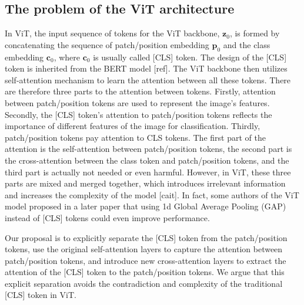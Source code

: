 \documentclass[anon,12pt]{colt2024} %
\begin{document}
\subsection{The problem of the ViT architecture}

In ViT, the input sequence of tokens for the ViT backbone, $\mathbf{z}_0$, is formed by concatenating the sequence of patch/position embedding  $\mathbf{p}_0$ and the class embedding  $\mathbf{c}_0$, where $\mathbf{c}_0$ is usually called [CLS] token.
The design of the [CLS] token is inherited from the BERT model [ref].%
The ViT backbone then utilizes self-attention mechanism to learn the attention between all these tokens.
There are therefore three parts to the attention between tokens. Firstly, attention between patch/position tokens are used to represent the image's features. Secondly, the [CLS] token's attention to patch/position tokens reflects the importance of different features of the image for classification. Thirdly, patch/position tokens pay attention to CLS tokens.
The first part of the attention is the self-attention between patch/position tokens, the second part is the cross-attention between the class token and patch/position tokens, and the third part is actually not needed or even harmful.
However, in ViT, these three parts are mixed and merged together, which introduces irrelevant information and increases the complexity of the model [cait].
In fact, some authors of the ViT model proposed in a later paper \cite{beyer2022better} that using 1d Global Average Pooling (GAP) instead of [CLS] tokens could even improve performance.

Our proposal is to explicitly separate the [CLS] token from the patch/position tokens, use the original self-attention layers to capture the attention between patch/position tokens, and introduce new cross-attention layers to extract the attention of the [CLS] token to the patch/position tokens.
We argue that this explicit separation avoids the contradiction and complexity of the traditional [CLS] token in ViT.
\end{document}
